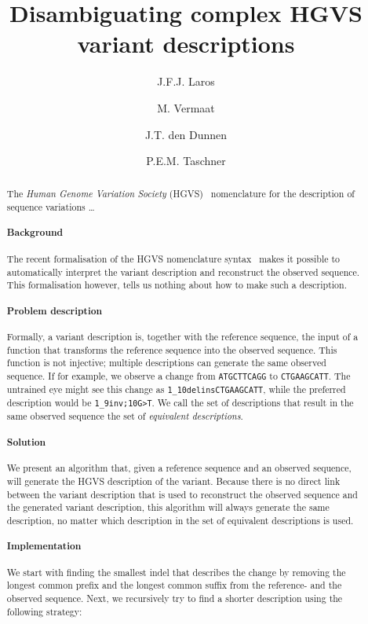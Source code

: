 \documentclass{article}
\author{J.F.J. Laros \and M. Vermaat \and J.T. den Dunnen \and P.E.M. Taschner}
\title{Disambiguating complex HGVS variant descriptions}
\begin{document}
\maketitle

\begin{abstract} \noindent
The \emph{Human Genome Variation Society} (HGVS)~\cite{NOM1} nomenclature for
the description of sequence variations \ldots

\paragraph{Background}
The recent formalisation of the HGVS nomenclature syntax~\cite{hgvs_bnf} makes
it possible to automatically interpret the variant description and reconstruct
the observed sequence. This formalisation however, tells us nothing about how
to make such a description.

\paragraph{Problem description}
Formally, a variant description is, together with the reference sequence, the
input of a function that transforms the reference sequence into the observed
sequence. This function is not injective; multiple descriptions can generate
the same observed sequence. If for example, we observe a change from
\texttt{ATGCTTCAGG} to \texttt{CTGAAGCATT}. The untrained eye might see this
change as \texttt{1\_10delinsCTGAAGCATT}, while the preferred description would
be \texttt{1\_9inv;10G>T}. We call the set of descriptions that result in the
same observed sequence the set of \emph{equivalent descriptions}.

\paragraph{Solution}
We present an algorithm that, given a reference sequence and an observed
sequence, will generate the HGVS description of the variant. Because there is
no direct link between the variant description that is used to reconstruct the
observed sequence and the generated variant description, this algorithm will
always generate the same description, no matter which description in the set of
equivalent descriptions is used.

\paragraph{Implementation}
We start with finding the smallest indel that describes the change by removing
the longest common prefix and the longest common suffix from the reference- and
the observed sequence. Next, we recursively try to find a shorter description
using the following strategy:


\end{abstract}
\end{document}
